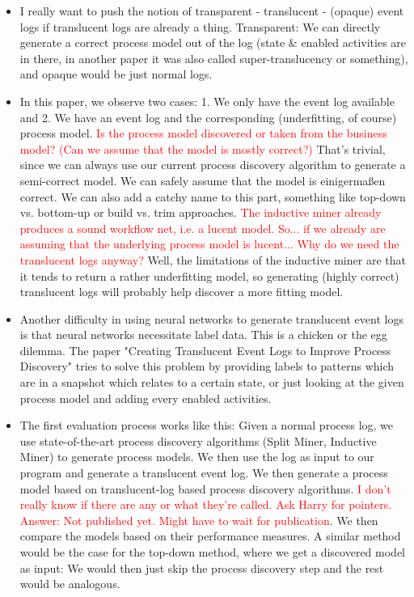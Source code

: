 \documentclass[a4paper,11pt,twoside]{pads-thesis}
\begin{document}
\begin{itemize}
        \item I really want to push the notion of transparent - translucent - (opaque) event logs if translucent logs are already a thing. Transparent: We can directly generate a correct process model out of the log (state \& enabled activities are in there, in another paper it was also called super-translucency or something), and opaque would be just normal logs.
        \item In this paper, we observe two cases: 1. We only have the event log available and 2. We have an event log and the corresponding (underfitting, of course) process model. \textcolor{red}{Is the process model discovered or taken from the business model? (Can we assume that the model is mostly correct?)} That's trivial, since we can always use our current process discovery algorithm to generate a semi-correct model. We can safely assume that the model is einigermaßen correct. We can also add a catchy name to this part, something like top-down vs. bottom-up or build vs. trim approaches. \textcolor{red}{The inductive miner already produces a sound workflow net, i.e. a lucent model. So... if we already are assuming that the underlying process model is lucent... Why do we need the translucent logs anyway?} Well, the limitations of the inductive miner are that it tends to return a rather underfitting model, so generating (highly correct) translucent logs will probably help discover a more fitting model.
        
        \item Another difficulty in using neural networks to generate translucent event logs is that neural networks necessitate label data. This is a chicken or the egg dilemma. The paper "Creating Translucent Event Logs to Improve Process Discovery" tries to solve this problem by providing labels to patterns which are in a snapshot which relates to a certain state, or just looking at the given process model and adding every enabled activities.

        \item The first evaluation process works like this: Given a normal process log, we use state-of-the-art process discovery algorithms (Split Miner, Inductive Miner) to generate process models. We then use the log as input to our program and generate a translucent event log. We then generate a process model based on translucent-log based process discovery algorithms. \textcolor{red}{I don't really know if there are any or what they're called. Ask Harry for pointers. Answer: Not published yet. Might have to wait for publication}. We then compare the models based on their performance measures. A similar method would be the case for the top-down method, where we get a discovered model as input: We would then just skip the process discovery step and the rest would be analogous.


\end{itemize}
\end{document}
